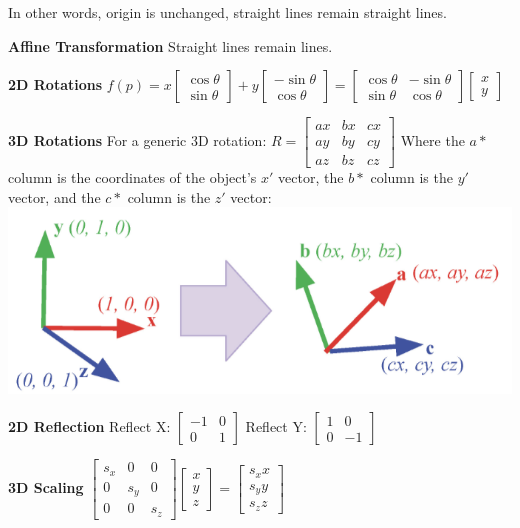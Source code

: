 \documentclass[letterpaper, 8pt]{extarticle}
\begin{document}
\begin{multicols*}{4}
In other words, origin is unchanged, straight lines remain straight lines.

\textbf{Affine Transformation}
Straight lines remain lines.

\textbf{2D Rotations}
\(
f(p)
= x \begin{bmatrix}
    \cos \theta \\ \sin \theta
\end{bmatrix}
+ y \begin{bmatrix}
    -\sin \theta \\ \cos \theta
\end{bmatrix}
= \begin{bmatrix}
    \cos \theta & - \sin \theta \\
    \sin \theta &   \cos \theta
\end{bmatrix}
\begin{bmatrix}
    x \\ y
\end{bmatrix}
\)

\textbf{3D Rotations}
For a generic 3D rotation:
\(
R =
\begin{bmatrix}
    ax & bx & cx \\
    ay & by & cy \\
    az & bz & cz
\end{bmatrix}
\)
Where the \(a*\) column is the coordinates of the object's \(x'\) vector,
the \(b*\) column is the \(y'\) vector,
and the \(c*\) column is the \(z'\) vector:
\includegraphics[width=\linewidth]{3d-rotation.png}

\textbf{2D Reflection}
Reflect X:\@
\(
\begin{bmatrix} -1 & 0 \\ 0 & 1 \end{bmatrix}
\)
Reflect Y:\@
\(
\begin{bmatrix} 1 & 0 \\ 0 & -1 \end{bmatrix}
\)

\textbf{3D Scaling}
\(
\begin{bmatrix}
    s_x & 0 & 0 \\
    0 & s_y & 0 \\
    0 & 0 & s_z
\end{bmatrix}
\begin{bmatrix}
    x \\ y \\ z
\end{bmatrix}
=
\begin{bmatrix}
    s_x x \\ s_y y \\ s_z z
\end{bmatrix}
\)


\end{multicols*}
\end{document}
